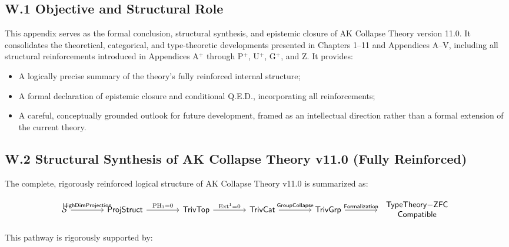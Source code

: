 \documentclass[11pt]{article}
\begin{document}
\subsection*{W.1 Objective and Structural Role}

This appendix serves as the formal conclusion, structural synthesis, and epistemic closure of AK Collapse Theory version 11.0.  
It consolidates the theoretical, categorical, and type-theoretic developments presented in Chapters 1–11 and Appendices A–V, including all structural reinforcements introduced in Appendices A$^{+}$ through P$^{+}$, U$^{+}$, G$^{+}$, and Z.  
It provides:

\begin{itemize}
    \item A logically precise summary of the theory's fully reinforced internal structure;
    \item A formal declaration of epistemic closure and conditional Q.E.D., incorporating all reinforcements;
    \item A careful, conceptually grounded outlook for future development, framed as an intellectual direction rather than a formal extension of the current theory.
\end{itemize}

\subsection*{W.2 Structural Synthesis of AK Collapse Theory v11.0 (Fully Reinforced)}

The complete, rigorously reinforced logical structure of AK Collapse Theory v11.0 is summarized as:

\[
\begin{tikzcd}[column sep=4em, row sep=3em]
\mathcal{S} \arrow[r, "\mathsf{HighDimProjection}"]
& \mathsf{ProjStruct} \arrow[r, "\mathrm{PH}_1 = 0"]
& \mathsf{TrivTop} \arrow[r, "\mathrm{Ext}^1 = 0"]
& \mathsf{TrivCat} \arrow[r, "\mathsf{GroupCollapse}"]
& \mathsf{TrivGrp} \arrow[r, "\mathsf{Formalization}"]
& {\begin{tabular}{c}
\(\mathsf{TypeTheory{-}ZFC}\) \\
\(\mathsf{Compatible}\)
\end{tabular}}
\end{tikzcd}
\]

This pathway is rigorously supported by:
\end{document}
